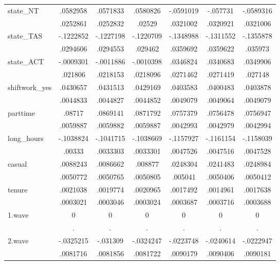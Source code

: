 {\begin{tabular}{l*{6}{c}}
state\_NT    &    .0582958&    .0571833&    .0580826&   -.0591019&    -.057731&   -.0589316\\
            &    .0252861&    .0252832&      .02529&    .0321002&    .0320921&    .0321006\\
state\_TAS   &   -.1222852&   -.1227198&   -.1220709&   -.1348988&   -.1311552&   -.1355878\\
            &    .0294606&    .0294553&     .029462&    .0359692&    .0359622&     .035973\\
state\_ACT   &   -.0009301&   -.0011886&   -.0010398&    .0346824&    .0340683&    .0349906\\
            &     .021806&    .0218153&    .0218096&    .0271462&    .0271419&     .027148\\
shiftwork\_yes&    .0430657&    .0431513&    .0429169&    .0403583&    .0400483&    .0403878\\
            &    .0044833&    .0044827&    .0044852&    .0049079&    .0049064&    .0049079\\
parttime    &      .08717&    .0869141&    .0871792&    .0757379&    .0756478&    .0756947\\
            &    .0059887&    .0059882&    .0059887&    .0042993&    .0042979&    .0042994\\
long\_hours  &   -.1038824&   -.1041715&   -.1038669&   -.1157927&   -.1161154&   -.1158039\\
            &      .00333&    .0033303&    .0033301&    .0047526&    .0047516&    .0047528\\
casual      &    .0088243&    .0086662&     .008877&    .0248304&    .0241483&    .0248984\\
            &    .0050772&    .0050765&    .0050805&     .005041&    .0050406&    .0050412\\
tenure      &    .0021038&    .0019774&    .0020965&    .0017492&    .0014961&    .0017638\\
            &    .0003021&    .0003046&    .0003024&    .0003687&    .0003716&    .0003688\\
1.wave      &           0&           0&           0&           0&           0&           0\\
            &           .&           .&           .&           .&           .&           .\\
2.wave      &   -.0325215&    -.031309&   -.0324247&   -.0223748&   -.0240614&   -.0222947\\
            &    .0081716&    .0081856&    .0081722&    .0090179&    .0090406&    .0090181\\

\end{tabular}}
